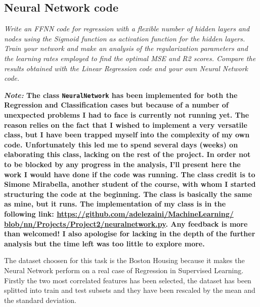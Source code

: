 \documentclass[english,notitlepage,reprint,nofootinbib]{revtex4-1}  %
\begin{document}
\subsection{Neural Network code}

\textit{Write an FFNN code for regression with a flexible number of hidden layers and nodes using the Sigmoid function as activation function for the hidden layers.
Train your network and make an analysis of the regularization parameters and the learning rates employed to find the optimal MSE and R2 scores. Compare the results obtained with the Linear Regression code and your own Neural Network code.}

\textbf{\textit{Note:} The class \texttt{NeuralNetwork} has been implemented for both the Regression and Classification cases but because of a number of unexpected problems I had to face is currently not running yet. The reason relies on the fact that I wished to implement a very versatile class, but I have been trapped myself into the complexity of my own code. Unfortunately this led me to spend several days (weeks) on elaborating this class, lacking on the rest of the project. In order not to be blocked by any progress in the analysis, I'll present here the work I would have done if the code was running. The class credit is to Simone Mirabella, another student of the course, with whom I started structuring the code at the beginning. The class is basically the same as mine, but it runs. The implementation of my class is in the following link: \href{https://github.com/adelezaini/MachineLearning/blob/nn/Projects/Project2/neuralnetwork.py}{https://github.com/adelezaini/MachineLearning/
blob/nn/Projects/Project2/neuralnetwork.py}. Any feedback is more than welcomed! I also apologise for lacking in the depth of the further analysis but the time left was too little to explore more.}

The dataset choosen for this task is the {Boston Housing} because it makes the Neural Network perform on a real case of Regression in Supervised Learning. Firstly the two most correlated features has been selected, the dataset has been splitted into train and test subsets and they have been rescaled by the mean and the standard deviation.
\end{document}
